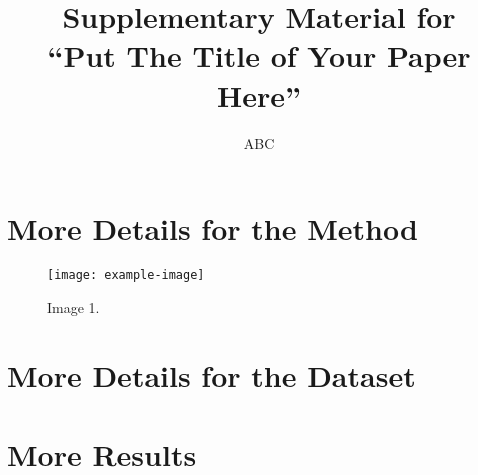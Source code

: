 \documentclass[10pt,letterpaper]{article}
\begin{document}
\title{Supplementary Material for \\ ``Put The Title of Your Paper Here''}

\author{ABC}
\maketitle

{
    \hypersetup{linkcolor=black}
    \tableofcontents
}

\clearpage

\section{More Details for the Method}
\begin{figure}[h] \centering
    \texttt{[image: example-image]}
    \caption{Image 1.} \label{fig:}
\end{figure}

\begin{table}[h]\centering
    \caption{A simple table with a header row.}
    \label{tab:table1}
\end{table}

\section{More Details for the Dataset}

\section{More Results}

\pagebreak
{\small


}
\end{document}

